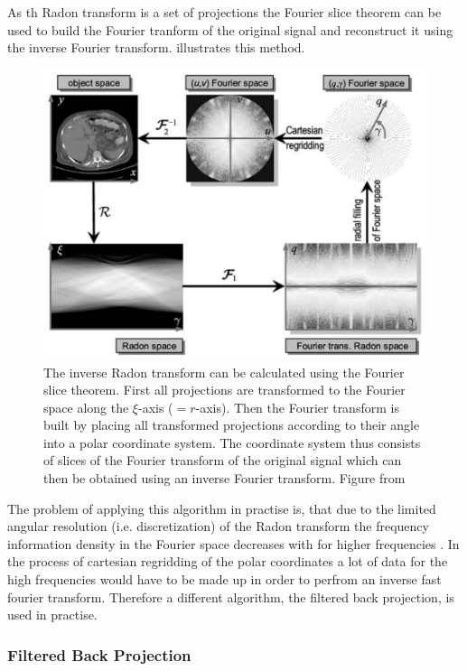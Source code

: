 \documentclass[10pt,journal,compsoc]{IEEEtran}
\begin{document}
As th Radon transform is a set of projections the Fourier slice theorem can be used to build the Fourier tranform of the original signal and reconstruct it using the inverse Fourier transform.
 illustrates this method.
%
\begin{figure}[!h]
\centering
\includegraphics[width=\linewidth]{img/inverseradon.png}
\caption{
The inverse Radon transform can be calculated using the Fourier slice theorem.
First all projections are transformed to the Fourier space along the $\xi$-axis ($=r$-axis).
Then the Fourier transform is built by placing all transformed projections according to their angle into a polar coordinate system.
The coordinate system thus consists of slices of the Fourier transform of the original signal which can then
be obtained using an inverse Fourier transform.
Figure from \cite{Buzug2008_chap5}
}
\label{fig:inverseradon}
\end{figure}
%
The problem of applying this algorithm in practise is, that due to the limited angular resolution (i.e. discretization) of the Radon transform the frequency information density in the Fourier space decreases with for higher frequencies \cite{Buzug2008_chap5}.
In the process of cartesian regridding of the polar coordinates a lot of data for the high frequencies would have to be made up in order to perfrom an inverse fast fourier transform.
Therefore a different algorithm, the filtered back projection, is used in practise.

\subsubsection{Filtered Back Projection}
\end{document}
